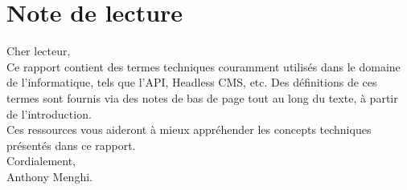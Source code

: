 \chapter*{Note de lecture}


Cher lecteur, \\

Ce rapport contient des termes techniques couramment utilisés dans le domaine de l'informatique, tels que l'API, Headless CMS, etc. Des définitions de ces termes sont fournis via des notes de bas de page tout au long du texte, à partir de l'introduction. \\
Ces ressources vous aideront à mieux appréhender les concepts techniques présentés dans ce rapport. \\ 

Cordialement, \\ 

Anthony Menghi.